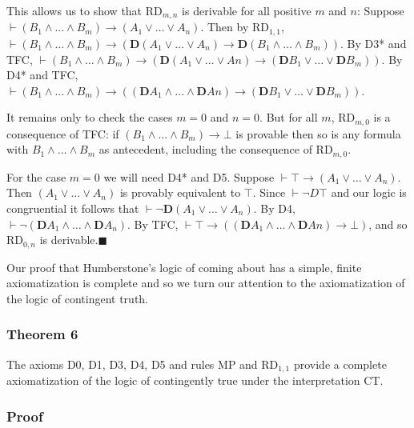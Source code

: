 \documentclass[
  11pt,
  letterpaper,
  DIV=11,
  numbers=noendperiod,
  twoside]{scrartcl}
\begin{document}
This allows us to show that RD\(_{m,n}\) is derivable for all positive
\(m\) and \(n\): Suppose
\(\vdash (B_1 \wedge {\ldots}\wedge B_m) \rightarrow (A_1\vee {\ldots}\vee A_n)\).
Then by RD\(_{1,1}\),\\
\(\vdash (B_1 \wedge {\ldots}\wedge B_m) \rightarrow (\mathbf{D}(A_1\vee {\ldots}\vee A_n) \rightarrow \mathbf{D}(B_1 \wedge {\ldots}\wedge B_m))\).
By D3* and TFC,
\(\vdash (B_1 \wedge {\ldots}\wedge B_m) \rightarrow (\mathbf{D}(A_1\vee {\ldots}\vee An) \rightarrow (\mathbf{D}B_1 \vee {\ldots}\vee \mathbf{D}B_m))\).
By D4* and TFC,
\(\vdash (B_1 \wedge {\ldots}\wedge B_m) \rightarrow ((\mathbf{D}A_1\wedge {\ldots}\wedge \mathbf{D}An) \rightarrow (\mathbf{D}B_1 \vee {\ldots}\vee \mathbf{D}B_m))\).

It remains only to check the cases \(m{=}0\) and \(n{=}0\). But for all
\(m\), RD\(_{m,0}\) is a consequence of TFC: if
\((B_1\wedge {\ldots}\wedge B_m)\rightarrow \bot\) is provable then so
is any formula with \(B_1\wedge {\ldots}\wedge B_m\) as antecedent,
including the consequence of RD\(_{m,0}\).

For the case \(m=0\) we will need D4* and D5. Suppose
\(\vdash \top \rightarrow (A_1\vee {\ldots}\vee A_n)\). Then
\((A_1\vee {\ldots}\vee A_n)\) is provably equivalent to \(\top\). Since
\(\vdash \neg D\top\) and our logic is congruential it follows that
\(\vdash \neg \mathbf{D}(A_1\vee {\ldots}\vee A_n)\). By D4,
\(\vdash \neg (\mathbf{D}A_1\wedge {\ldots}\wedge \mathbf{D}A_n)\). By
TFC,
\(\vdash \top \rightarrow ( (\mathbf{D}A_1\wedge {\ldots}\wedge \mathbf{D}An) \rightarrow \bot)\),
and so RD\(_{0,n}\) is derivable.\(\blacksquare\)

Our proof that Humberstone's logic of coming about has a simple, finite
axiomatization is complete and so we turn our attention to the
axiomatization of the logic of contingent truth.

\subsubsection*{Theorem 6}\label{theorem-6}

The axioms D0, D1, D3, D4, D5 and rules MP and RD\(_{1,1}\) provide a
complete axiomatization of the logic of contingently true under the
interpretation CT.

\subsubsection*{Proof}\label{proof-7}
\end{document}
